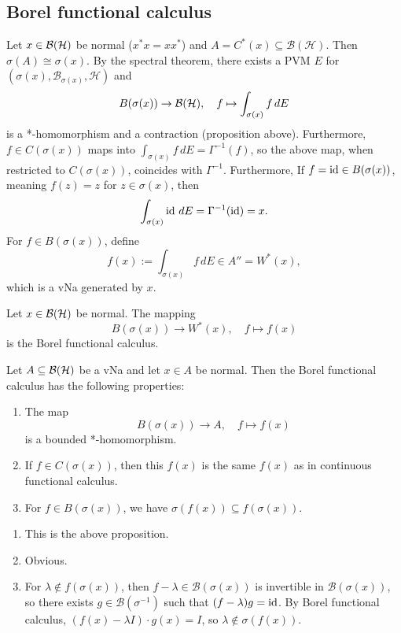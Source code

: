 \subsection{Borel functional calculus}

Let $x \in \operatorname{\mathcal{B} (\mathcal{H})}$ be normal ($x^* x = x x^*$) and $A = C^* (x) \subseteq \mathcal{B}(\mathcal{H})$.
Then $\sigma(A) \cong \sigma(x)$. By the spectral theorem, there exists a PVM $E$ for $(\sigma(x), \mathcal{B}_{\sigma(x)}, \mathcal{H})$ 
and $$B (\sigma(x)) \to \operatorname{\mathcal{B} (\mathcal{H})},\quad f \mapsto \int_{\sigma(x)} f\, dE$$
is a *-homomorphism and a contraction (proposition above).
Furthermore, $f \in C(\sigma(x))$ maps into $\int_{\sigma(x)} f\, dE = \Gamma^{-1} (f)$,
so the above map, when restricted to $C(\sigma(x))$, coincides with $\Gamma^{-1}$.
Furthermore,
If $f = \operatorname{id} \in B(\sigma(x))$, meaning $f(z) = z$ for $z \in \sigma(x)$, then 
$$\int_{\sigma(x)} \operatorname{id} \, dE = \Gamma^{-1} (\operatorname{id}) = x.$$
For $f \in B (\sigma(x))$, define 
$$f(x) := \int_{\sigma(x)} f\, dE \in A''  = W^* (x),$$
which is a vNa generated by $x$.

\begin{definition}
  Let $x \in \operatorname{\mathcal{B} (\mathcal{H})}$ be normal. The mapping 
  $$B (\sigma(x)) \to W^* (x),\quad f \mapsto f(x)$$
  is the Borel functional calculus.
\end{definition}

\begin{theorem}
  Let $A \subseteq \operatorname{\mathcal{B} (\mathcal{H})}$ be a vNa and let $x \in A$ be normal.
  Then the Borel functional calculus has the following properties:
  \begin{enumerate}
    \item The map $$B (\sigma(x)) \to A,\quad f \mapsto f(x)$$
    is a bounded *-homomorphism.
    \item If $f \in C(\sigma(x))$, then this $f(x)$ is the same $f(x)$ as in continuous functional calculus.
    \item For $f \in B (\sigma(x))$, we have $\sigma(f(x)) \subseteq f(\sigma(x))$.
  \end{enumerate}
\end{theorem}

\begin{myproof}
  \begin{enumerate}
    \item This is the above proposition.
    \item Obvious.
    \item For $\lambda \notin f(\sigma (x))$, then $f - \lambda \in \mathcal{B} (\sigma(x))$
    is invertible in $\mathcal{B}(\sigma(x))$, so there exists $g \in \mathcal{B} (\sigma^{-1})$ such that $(f - \lambda) g = \operatorname{id}$.
    By Borel functional calculus, $(f(x) - \lambda I) \cdot g(x) = I$, so $\lambda \notin \sigma(f(x))$. \qedhere
  \end{enumerate}
\end{myproof}


